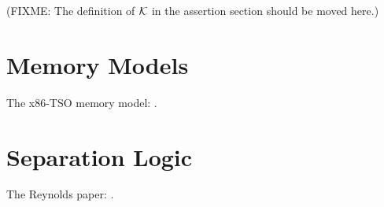 \documentclass[11pt]{report}
\begin{document}
(FIXME: The definition of $\mathcal{K}$ in the assertion section should be moved here.)

% 

% 
% 


\section{Memory Models} %
\label{sec:memory-models}

The x86-TSO memory model: \cite{DBLP:conf/tphol/OwensSS09}. 


\section{Separation Logic} %
\label{sec:separation-logic}

The Reynolds paper: \cite{DBLP:conf/lics/Reynolds02}. 

\end{document}
